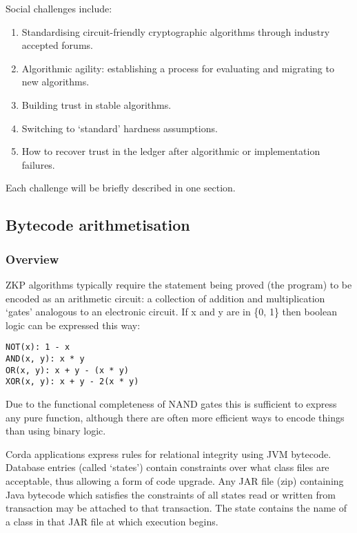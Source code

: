 \documentclass{article}
\begin{document}
Social challenges include:

\begin{enumerate}
    \item Standardising circuit-friendly cryptographic algorithms through industry accepted forums.
    \item Algorithmic agility: establishing a process for evaluating and migrating to new algorithms.
    \item Building trust in stable algorithms.
    \item Switching to `standard' hardness assumptions.
    \item How to recover trust in the ledger after algorithmic or implementation failures.
\end{enumerate}

Each challenge will be briefly described in one section.

\subsection{Bytecode arithmetisation}

\subsubsection{Overview}

ZKP algorithms typically require the statement being proved (the program) to be encoded as
an arithmetic circuit: a collection of addition and multiplication `gates' analogous to an electronic circuit.
If x and y are in \{0, 1\} then boolean logic can be expressed this way:

\begin{lstlisting}
NOT(x): 1 - x
AND(x, y): x * y
OR(x, y): x + y - (x * y)
XOR(x, y): x + y - 2(x * y)
\end{lstlisting}

Due to the functional completeness of NAND gates this is sufficient to express any pure function, although there
are often more efficient ways to encode things than using binary logic.

Corda applications express rules for relational integrity using JVM bytecode. Database entries (called `states')
contain constraints over what class files are acceptable, thus allowing a form of code upgrade. Any JAR file (zip)
containing Java bytecode which satisfies the constraints of all states read or written from transaction may be
attached to that transaction. The state contains the name of a class in that JAR file at which execution begins.
\end{document}
